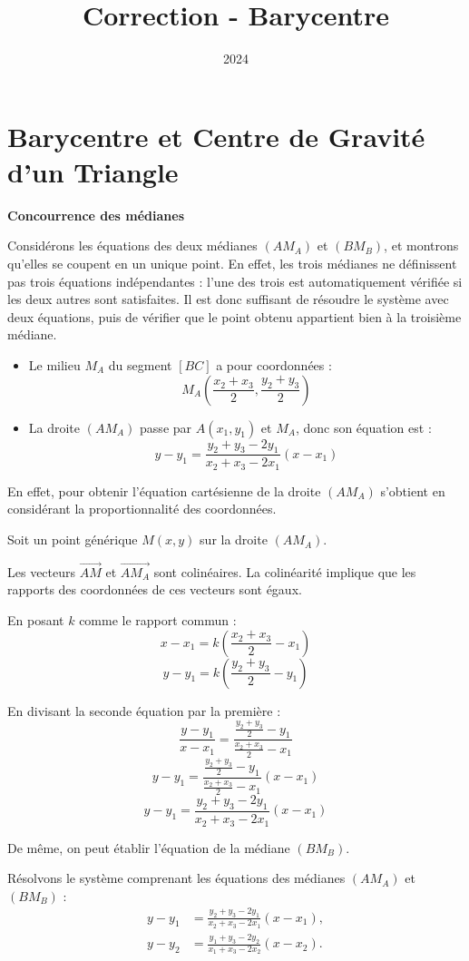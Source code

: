 \documentclass[10pt,a4paper]{article}
\title{Correction - Barycentre}
\author{}
\date{2024}
\begin{document}
\section{Barycentre et Centre de Gravité d'un Triangle}

\q \textbf{Concourrence des médianes}
\setcounter{ql}{0}

\ql Considérons les équations des deux médianes $(AM_A)$ et $(BM_B)$, et montrons qu'elles se
coupent en un unique point. En effet, les trois médianes ne définissent pas trois équations
indépendantes : l'une des trois est automatiquement vérifiée si les deux autres sont
satisfaites. Il est donc suffisant de résoudre le système avec deux équations, puis de vérifier que
le point obtenu appartient bien à la troisième médiane.

\begin{itemize}
    \item Le milieu $M_A$ du segment $[BC]$ a pour coordonnées :
    $$
    M_A \left( \frac{x_2 + x_3}{2}, \frac{y_2 + y_3}{2} \right)
    $$
    \item La droite $(AM_A)$ passe par $A(x_1, y_1)$ et $M_A$, donc son équation est :
    $$
    y - y_1 = \frac{y_2 + y_3 - 2y_1}{x_2 + x_3 - 2x_1} (x - x_1)
    $$
\end{itemize}
En effet, pour obtenir l'équation cartésienne de la droite $(AM_A)$ s'obtient en considérant la
proportionnalité des coordonnées.

Soit un point générique $M(x,y)$ sur la droite $(AM_A)$.

Les vecteurs $\overrightarrow{AM}$ et $\overrightarrow{AM_A}$ sont colinéaires.
La colinéarité implique que les rapports des coordonnées de ces vecteurs sont égaux.

En posant $k$ comme le rapport commun :
$$
x - x_1 = k(\frac{x_2 + x_3}{2} - x_1)
$$
$$
y - y_1 = k(\frac{y_2 + y_3}{2} - y_1)
$$

En divisant la seconde équation par la première :
$$
\frac{y - y_1}{x - x_1} = \frac{\frac{y_2 + y_3}{2} - y_1}{\frac{x_2 + x_3}{2} - x_1}
$$
$$
y - y_1 = \frac{\frac{y_2 + y_3}{2} - y_1}{\frac{x_2 + x_3}{2} - x_1}(x - x_1)
$$
$$
y - y_1 = \frac{y_2 + y_3 - 2y_1}{x_2 + x_3 - 2x_1}(x - x_1)
$$



De même, on peut établir l'équation de la médiane $(BM_B)$.

Résolvons le système comprenant les équations des médianes \((AM_A)\) et \((BM_B)\) :
\begin{align*}
y - y_1 &= \frac{y_2 + y_3 - 2y_1}{x_2 + x_3 - 2x_1} (x - x_1), \\
y - y_2 &= \frac{y_1 + y_3 - 2y_2}{x_1 + x_3 - 2x_2} (x - x_2).
\end{align*}
\end{document}
